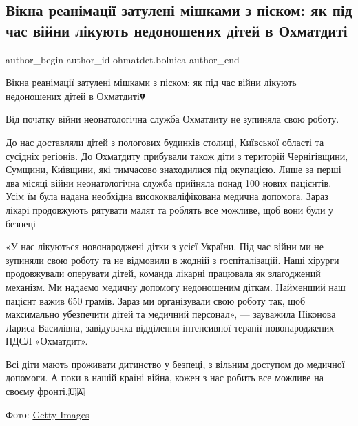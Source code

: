  
 
 
 
 
 
\subsection{Вікна реанімації затулені мішками з піском: як під час війни лікують недоношених дітей в Охматдиті}
\label{sec:08_12_2022.fb.ohmatdet.bolnica.1.reanimacia_pisok_dity}
 
\ifcmt
 author_begin
   author_id ohmatdet.bolnica
 author_end
\fi

Вікна реанімації затулені мішками з піском: як під час війни лікують
недоношених дітей в Охматдиті💔

Від початку війни неонатологічна служба Охматдиту не зупиняла свою роботу. 


До нас доставляли дітей з пологових будинків столиці, Київської області та
сусідніх регіонів. До Охматдиту прибували також діти з територій Чернігівщини,
Сумщини, Київщини, які тимчасово знаходилися під окупацією. Лише за перші два
місяці війни неонатологічна служба прийняла понад 100 нових пацієнтів. Усім їм
була надана необхідна висококваліфікована медична допомога. Зараз лікарі
продовжують рятувати малят та роблять все можливе, щоб вони були у безпеці🙏🏻


«У нас лікуються новонароджені дітки з усієї України. Під час війни ми не
зупиняли свою роботу та не відмовили в жодній з госпіталізацій. Наші хірурги
продовжували оперувати дітей, команда лікарні працювала як злагоджений
механізм. Ми надаємо медичну допомогу недоношеним діткам. Найменший наш пацієнт
важив 650 грамів. Зараз ми організували свою роботу так, щоб максимально
убезпечити дітей та медичний персонал», — зауважила Ніконова Лариса Василівна,
завідувачка відділення інтенсивної терапії новонароджених НДСЛ «Охматдит». 🙌


Всі діти мають проживати дитинство у безпеці, з вільним доступом до медичної
допомоги. А поки в нашій країні війна, кожен з нас робить все можливе на своєму
фронті.🇺🇦

Фото: \href{https://www.facebook.com/gettyimages/}{Getty Images}

